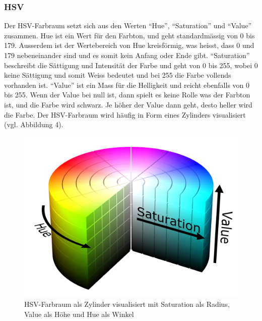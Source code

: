 \documentclass[a4paper, 12pt]{article}
\begin{document}
\subsubsection{HSV}
Der HSV-Farbraum setzt sich aus den Werten "`Hue"', "`Saturation"' und "`Value"' zusammen. Hue ist ein Wert für den Farbton, und geht standardmässig von 0 bis 179. Ausserdem ist der Wertebereich von Hue kreisförmig, was heisst, dass 0 und 179 nebeneinander sind und es somit kein Anfang oder Ende gibt. "`Saturation"' beschreibt die Sättigung und Intensität der Farbe und geht von 0 bis 255, wobei 0 keine Sättigung und somit Weiss bedeutet und bei 255 die Farbe vollends vorhanden ist. "`Value"' ist ein Mass für die Helligkeit und reicht ebenfalls von 0 bis 255. Wenn der Value bei null ist, dann spielt es keine Rolle was der Farbton ist, und die Farbe wird schwarz. Je höher der Value dann geht, desto heller wird die Farbe. Der HSV-Farbraum wird häufig in Form eines Zylinders visualisiert (vgl. Abbildung 4).
\begin{figure}[H]
\includegraphics[scale=0.07]{HSV_Zylinder} 
\caption{HSV-Farbraum als Zylinder visualisiert mit Saturation als Radius, Value als Höhe und Hue als Winkel}
\end{figure}
\end{document}
